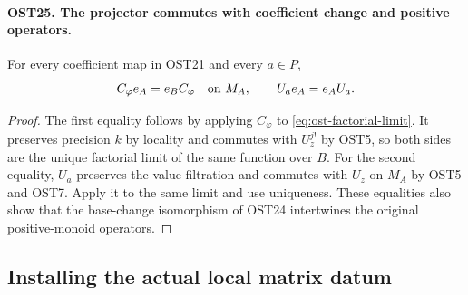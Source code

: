 \paragraph{OST25. The projector commutes with coefficient change and positive operators.}
\label{claim:OST25}
For every coefficient map in OST21 and every $a\in P$,
\[
 C_\varphi e_A=e_B C_\varphi\quad\hbox{on }M_A,
                  \qquad U_ae_A=e_AU_a.
\]
\begin{proof}
The first equality follows by applying $C_\varphi$ to
\eqref{eq:ost-factorial-limit}.  It preserves precision $k$
by locality and commutes with $U_z^{j!}$ by OST5, so both
sides are the unique factorial limit of the same function
over $B$.  For the second equality, $U_a$ preserves the
value filtration and commutes with $U_z$ on $M_A$ by OST5
and OST7.  Apply it to the same limit and use uniqueness.
These equalities also show that the base-change isomorphism
of OST24 intertwines the original positive-monoid operators.
\end{proof}

\subsection{Installing the actual local matrix datum}

